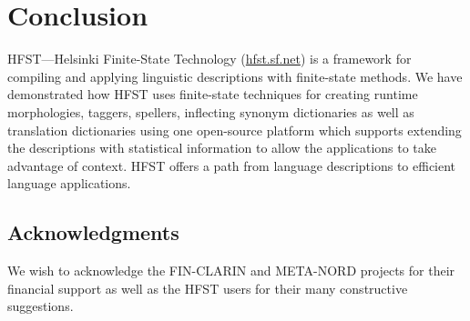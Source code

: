 \documentclass{llncs}
\begin{document}


\section{Conclusion}
HFST---Helsinki Finite-State Technology (\url{hfst.sf.net})
is a framework for compiling and applying linguistic descriptions
with finite-state methods. We have demonstrated how HFST uses finite-state techniques 
for creating runtime morphologies, taggers, spellers, inflecting synonym dictionaries as well as 
translation dictionaries using one open-source platform which supports extending  
the descriptions with statistical information to allow the applications 
to take advantage of context. HFST offers a path from language descriptions 
to efficient language applications.

\subsection*{Acknowledgments}
We wish to acknowledge the FIN-CLARIN and META-NORD projects for their financial support 
as well as the HFST users for their many constructive suggestions. 




\end{document}
